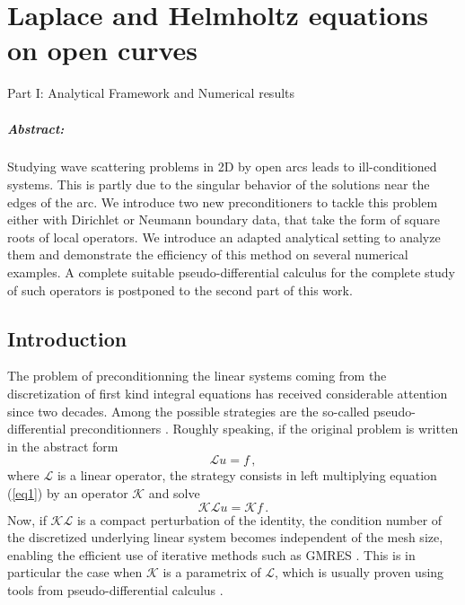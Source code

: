 \documentclass[a4paper]{subfiles}
\begin{document}
\chapter{Laplace and Helmholtz equations on open curves}
\begin{center}
	\huge
	Part I: Analytical Framework and Numerical results
\end{center}
\vspace{2cm}


\paragraph{Abstract:}
Studying wave scattering problems in 2D by open arcs leads to ill-conditioned systems. This is partly due to the singular behavior
of the solutions near the edges of the arc. We introduce two new preconditioners to tackle this problem either with Dirichlet or Neumann 
boundary data, that take the form of square roots of local operators. We introduce an adapted analytical setting to analyze them and 
demonstrate the efficiency of this method on several numerical examples. A complete suitable pseudo-differential calculus for the
complete study of such operators is postponed to the second part of this work.

\section{Introduction}

The problem of preconditionning the linear systems coming from the discretization of first kind integral equations
has received considerable attention since two decades. Among the possible strategies are the so-called pseudo-differential 
preconditionners \cite{alouges2007stable,alouges2005new,antoine2007generalized,christiansen2002preconditioner,hiptmair2014mesh,Steinbach98}. 
Roughly speaking, if the original problem is written in the abstract form
\begin{equation}
	\mathcal{L}u=f\,,
	\label{eq1}
\end{equation}
where $\mathcal{L}$ is a linear operator, the strategy consists in left multiplying equation (\ref{eq1}) by an operator $\mathcal{K}$ and solve
\begin{equation}
	\mathcal{K}\mathcal{L}u=\mathcal{K}f\,.	
\end{equation}
Now, if $\mathcal{K}\mathcal{L}$ is a compact perturbation of the identity, the condition number of the discretized underlying linear system 
becomes independent of the mesh size, enabling the efficient use of iterative methods such as GMRES \cite{saad1986gmres}. This is in particular the 
case when $\mathcal{K}$ is a parametrix of $\mathcal{L}$, which is usually proven using tools from pseudo-differential calculus 
\cite{steinbach1998construction}.
\end{document}
